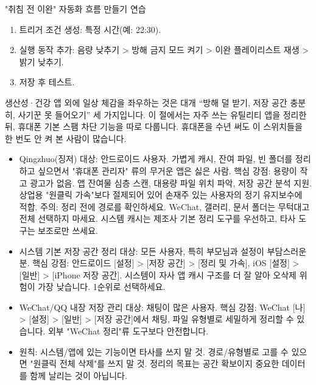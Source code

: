 \begin{tcbpractice}{"취침 전 이완" 자동화 흐름 만들기 연습}
\begin{enumerate}
  \item 트리거 조건 생성: 특정 시간(예: 22:30).
  \item 실행 동작 추가: 음량 낮추기 > 방해 금지 모드 켜기 > 이완 플레이리스트 재생 > 밝기 낮추기.
  \item 저장 후 테스트.
\end{enumerate}

\end{tcbpractice}


생산성·건강 앱 외에 일상 체감을 좌우하는 것은 대개 “방해 덜 받기, 저장 공간 충분히, 사기꾼 못 들어오기” 세 가지입니다. 이 절에서는 자주 쓰는 유틸리티 앱을 정리한 뒤, 휴대폰 기본 스팸 차단 기능을 따로 다룹니다. 휴대폰을 수년 써도 이 스위치들을 한 번도 안 켜 본 사람이 많습니다.


\begin{itemize}
  \item Qingzhuo(징저) 대상: 안드로이드 사용자. 가볍게 캐시, 잔여 파일, 빈 폴더를 정리하고 싶으면서 "휴대폰 관리자" 류의 무거운 앱은 싫은 사람. 핵심 강점: 용량이 작고 광고가 없음. 앱 잔여물 심층 스캔, 대용량 파일 위치 파악, 저장 공간 분석 지원. 상업용 "원클릭 가속"보다 절제되어 있어 손재주 있는 사용자의 정기 유지보수에 적합. 주의: 정리 전에 경로를 확인하세요. WeChat, 갤러리, 문서 폴더는 무턱대고 전체 선택하지 마세요. 시스템 캐시는 제조사 기본 정리 도구를 우선하고, 타사 도구는 보조로만 쓰세요.
  \item 시스템 기본 저장 공간 정리 대상: 모든 사용자, 특히 부모님과 설정이 부담스러운 분. 핵심 강점: 안드로이드 [설정] > [저장 공간] > [정리 및 가속], iOS [설정] > [일반] > [iPhone 저장 공간]. 시스템이 자사 앱 캐시 구조를 더 잘 알아 오삭제 위험이 가장 낮습니다. 1순위로 선택하세요.
  \item WeChat/QQ 내장 저장 관리 대상: 채팅이 많은 사용자. 핵심 강점: WeChat [나] > [설정] > [일반] > [저장 공간]에서 채팅, 파일 유형별로 세밀하게 정리할 수 있습니다. 외부 "WeChat 정리"류 도구보다 안전합니다.
  \item 원칙: 시스템/앱에 있는 기능이면 타사를 쓰지 말 것. 경로/유형별로 고를 수 있으면 "원클릭 전체 삭제"를 쓰지 말 것. 정리의 목표는 공간 확보이지 중요한 데이터를 함께 날리는 것이 아닙니다.
\end{itemize}

